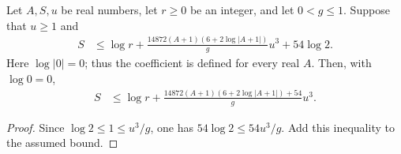 \begin{lemma}
    \label{thm:dg_entropy_coefficient_bound}
    \leanok
    Let $A,S,u$ be real numbers, let $r\ge0$ be an integer, and let $0<g\le1$.
    Suppose that $u\ge1$ and
    \begin{align*}
        S & \le\log r+
        \frac{14872(A+1)(6+2\log|A+1|)}{g}u^3+54\log2.
    \end{align*}
    Here $\log|0|=0$; thus the coefficient is defined for every real $A$.
    Then, with $\log0=0$,
    \begin{align}
        S & \le\log r+
        \frac{14872(A+1)(6+2\log|A+1|)+54}{g}u^3.
        \label{eq:dg_entropy_uniform_coefficient}
    \end{align}
\end{lemma}
\begin{proof}
    \leanok
    Since $\log2\le1\le u^3/g$, one has $54\log2\le54u^3/g$.
    Add this inequality to the assumed bound.
\end{proof}
